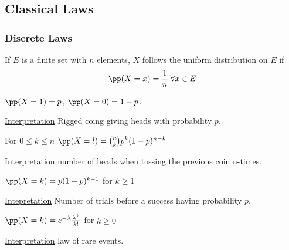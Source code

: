 \documentclass[../main.tex]{subfiles}
\begin{document}
\subsection{Classical Laws}
\subsubsection{Discrete Laws}
\begin{definition}
  If $E$ is a finite set with $n$ elements, $X$ follows the uniform
  distribution on $E$ if $$\pp(X = x) = \frac{1}{n} \;\forall x \in E $$
\end{definition}
\begin{definition}
  [Bernoulli]
  $\pp(X = 1) = p$, $\pp(X = 0)  =1-p$.

  \noindent \underline{Interpretation} Rigged coing giving heads with
  probability $p$.
\end{definition}

\begin{definition}
  For $0 \leq k \leq n$ $\pp(X = l) = \binom{n}{k}p^k(1-p)^{n-k}$

  \noindent\underline{Interpretation} number of heads when tossing the
  previous coin n-times.
\end{definition}

\begin{definition}
  $\pp(X=k) = p(1 - p)^{k-1}$ for $k \geq 1$

  \noindent\underline{Intepretation} Number of trials before a success having probability $p$.
\end{definition}

\begin{definition}
  $\pp(X = k) = e^{-\lambda} \frac{\lambda^k}{k!} $ for $k \geq 0$
  
  \noindent\underline{Interpretation} law of rare events.
\end{definition}
\end{document}
